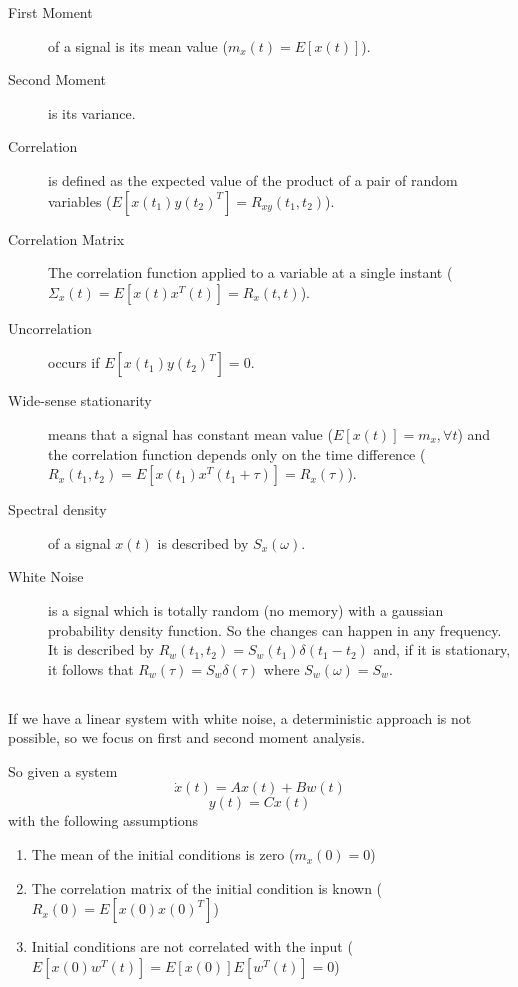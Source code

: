 \begin{description}
    \item[First Moment] of a signal is its mean value ($m_x(t)=E\left[ x(t) \right] $).
    \item[Second Moment] is its variance.
    \item[Correlation] is defined as the expected value of the product of a pair of random variables ($E[x(t_1)y(t_2)^{T}]=R_{xy}(t_1,t_2)$).
    \item[Correlation Matrix] The correlation function applied to a variable at a single instant ($\Sigma_x(t) = E\left[ x(t)x^{T}(t) \right] = R_x(t,t)$).
    \item[Uncorrelation] occurs if $E[x(t_1)y(t_2)^{T}] = 0$.
    \item[Wide-sense stationarity] means that a signal has constant mean value ($E\left[ x(t) \right] =m_x, \forall t$) and the correlation function depends only on the time difference ($R_x(t_1,t_2)=E\left[ x(t_1)x^{T}(t_1+\tau) \right] =R_x(\tau)$).
    \item[Spectral density] of a signal  $x(t)$ is described by $S_x(\omega)$.
    \item[White Noise] is a signal which is totally random (no memory) with a gaussian probability density function. So the changes can happen in any frequency. It is described by $R_w(t_1,t_2)=S_w(t_1)\delta(t_1-t_2)$ and, if it is stationary, it follows that $R_w(\tau)=S_w\delta(\tau)$ where $S_w(\omega)=S_w$.
\end{description}


\subsection*{}

If we have a linear system with white noise, a deterministic approach is not possible, so we focus on first and second moment analysis.

So given a system \[
    \dot{x}(t) = Ax(t) + Bw(t)
\] \[
y(t) = Cx(t)
\] with the following assumptions
\begin{enumerate}
    \item The mean of the initial conditions is zero ($m_x(0)=0$)
    \item The correlation matrix of the initial condition is known ($R_x(0)=E\left[ x(0)x(0)^{T} \right] $)
    \item Initial conditions are not correlated with the input ($E\left[ x(0)w^{T}(t) \right] = E\left[ x(0) \right] E\left[ w^{T}(t) \right] =0$)
\end{enumerate}

